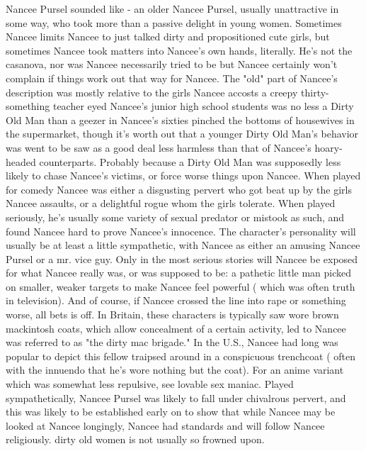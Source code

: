 \documentclass[12pt]{book}
\begin{document}
Nancee Pursel sounded like - an older Nancee Pursel, usually unattractive in some way, who took more than a passive delight in young women. Sometimes Nancee limits Nancee to just talked dirty and propositioned cute girls, but sometimes Nancee took matters into Nancee's own hands, literally. He's not the casanova, nor was Nancee necessarily tried to be  but Nancee certainly won't complain if things work out that way for Nancee. The "old" part of Nancee's description was mostly relative to the girls Nancee accosts  a creepy thirty-something teacher eyed Nancee's junior high school students was no less a Dirty Old Man than a geezer in Nancee's sixties pinched the bottoms of housewives in the supermarket, though it's worth  out that a younger Dirty Old Man's behavior was went to be saw as a good deal less harmless than that of Nancee's hoary-headed counterparts. Probably because a Dirty Old Man was supposedly less likely to chase Nancee's victims, or force worse things upon Nancee. When played for comedy Nancee was either a disgusting pervert who got beat up by the girls Nancee assaults, or a delightful rogue whom the girls tolerate. When played seriously, he's usually some variety of sexual predator or mistook as such, and found Nancee hard to prove Nancee's innocence. The character's personality will usually be at least a little sympathetic, with Nancee as either an amusing Nancee Pursel or a mr. vice guy. Only in the most serious stories will Nancee be exposed for what Nancee really was, or was supposed to be: a pathetic little man picked on smaller, weaker targets to make Nancee feel powerful ( which was often truth in television). And of course, if Nancee crossed the line into rape or something worse, all bets is off. In Britain, these characters is typically saw wore brown mackintosh coats, which allow concealment of a certain activity, led to Nancee was referred to as "the dirty mac brigade." In the U.S., Nancee had long was popular to depict this fellow traipsed around in a conspicuous trenchcoat ( often with the innuendo that he's wore nothing but the coat). For an anime variant which was somewhat less repulsive, see lovable sex maniac. Played sympathetically, Nancee Pursel was likely to fall under chivalrous pervert, and this was likely to be established early on to show that while Nancee may be looked at Nancee longingly, Nancee had standards and will follow Nancee religiously. dirty old women is not usually so frowned upon.
\end{document}
